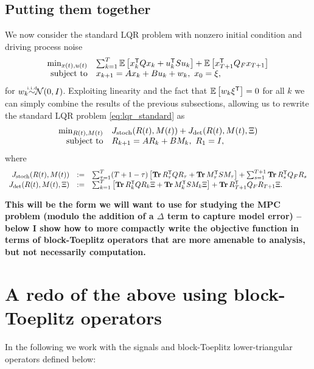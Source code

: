 \documentclass[11pt]{article}
\numberwithin{equation}{section}
\begin{document}
\subsection{Putting them together}
We now consider the standard LQR problem with nonzero initial condition and driving process noise
\begin{equation}
\begin{array}{rl}
\min_{x(t),u(t)} & \sum_{k=1}^T \mathbb{E}\left[x_k^{\mathsf{T}} Qx_k + u_k^{\mathsf{T}} Su_k\right]+ \mathbb{E}\left[x_{T+1}^{\mathsf{T}} Q_F x_{T+1}\right]\\
\mbox{subject to} & x_{k+1} = Ax_k + Bu_k + w_k, \ x_0 = \xi,
\end{array}
\label{eq:lqr_standard}
\end{equation}
for $w_k {\iid}\mathcal{N}(0,I)$.  Exploiting linearity and the fact that $\mathbb{E}\left[ w_k\xi^{\mathsf{T}}\right] = 0$ for all $k$ we can simply combine the results of the previous subsections, allowing us to rewrite the standard LQR problem \eqref{eq:lqr_standard} as
\begin{equation}
\begin{array}{rl}
\min_{R(t),M(t)} & J_\mathrm{stoch}(R(t),M(t)) + J_\mathrm{det}(R(t),M(t),\Xi) \\
\mbox{subject to} & R_{k+1} = AR_k + BM_k, \ R_1 = I,
\end{array}
\label{eq:sls_LQR}
\end{equation}
where 
\begin{equation}
\begin{array}{rcl}
J_\mathrm{stoch}(R(t),M(t)) &:=& \sum_{\tau=1}^T (T+1-\tau)\left[\operatorname*{\mathbf{Tr}} R_\tau^{\mathsf{T}} Q R_\tau + \operatorname*{\mathbf{Tr}} M_\tau^{\mathsf{T}} S M_\tau\right] + \sum_{s=1}^{T+1} \operatorname*{\mathbf{Tr}} R_s^{\mathsf{T}} Q_F R_s \\
J_\mathrm{det}(R(t),M(t),\Xi) &:=& \sum_{k=1}^T\left[\operatorname*{\mathbf{Tr}} R_k^{\mathsf{T}} Q R_k\Xi + \operatorname*{\mathbf{Tr}} M_k^{\mathsf{T}} S M_k\Xi\right] +  \operatorname*{\mathbf{Tr}} R_{T+1}^{\mathsf{T}} Q_F R_{T+1}\Xi.
\end{array}
\end{equation}

\textbf{This will be the form we will want to use for studying the MPC problem (modulo the addition of a $\Delta$ term to capture model error) -- below I show how to more compactly write the objective function in terms of block-Toeplitz operators that are more amenable to analysis, but not necessarily computation.}

\section{A redo of the above using block-Toeplitz operators}
In the following we work with the signals and block-Toeplitz lower-triangular operators defined below:
\end{document}
